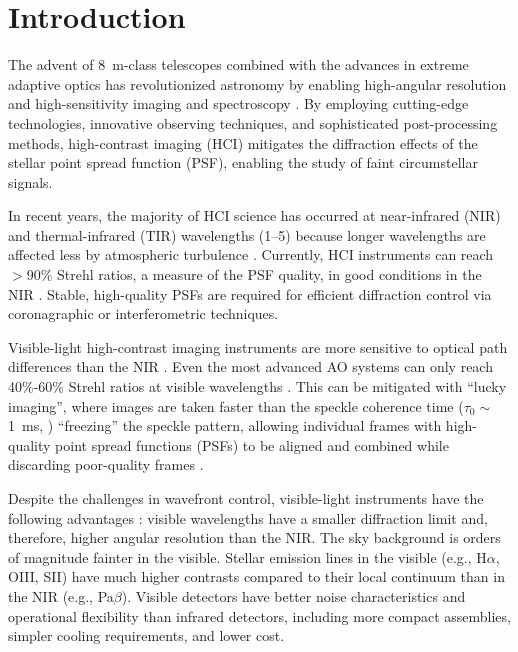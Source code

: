 \section{Introduction}\label{sec:intro}

The advent of \SI{8}{\meter}-class telescopes combined with the advances in extreme adaptive optics has revolutionized astronomy by enabling high-angular resolution and high-sensitivity imaging and spectroscopy \citep{guyon_extreme_2018}. By employing cutting-edge technologies, innovative observing techniques, and sophisticated post-processing methods, high-contrast imaging (HCI) mitigates the diffraction effects of the stellar point spread function (PSF), enabling the study of faint circumstellar signals.

In recent years, the majority of HCI science has occurred at near-infrared (NIR) and thermal-infrared (TIR) wavelengths (\SIrange{1}{5}{\micron}) because longer wavelengths are affected less by atmospheric turbulence \citep{fried_optical_1966,roddier_effects_1981}. Currently, HCI instruments can reach $>$90\% Strehl ratios, a measure of the PSF quality, in good conditions in the NIR \citep{beuzit_sphere_2019,lozi_status_2020}. Stable, high-quality PSFs are required for efficient diffraction control via coronagraphic or interferometric techniques.

Visible-light high-contrast imaging instruments are more sensitive to optical path differences than the NIR \citep{fried_optical_1966,roddier_effects_1981}. Even the most advanced AO systems can only reach 40\%-60\% Strehl ratios at visible wavelengths \citep{ahn_scexao_2021,males_magao-x_2022}. This can be mitigated with ``lucky imaging'', where images are taken faster than the speckle coherence time ($\tau_0 \sim$\SI{1}{\milli\second}, \citealp{kooten_climate_2022}) ``freezing'' the speckle pattern, allowing individual frames with high-quality point spread functions (PSFs) to be aligned and combined while discarding poor-quality frames \citep{law_lucky_2006, garrel_highly_2012, lang_tractor_2016}.

Despite the challenges in wavefront control, visible-light instruments have the following advantages \citep{close_into_2014}: visible wavelengths have a smaller diffraction limit and, therefore, higher angular resolution than the NIR. The sky background is orders of magnitude fainter in the visible. Stellar emission lines in the visible (e.g., H$\alpha$, OIII, SII) have much higher contrasts compared to their local continuum than in the NIR (e.g., Pa$\beta$). Visible detectors have better noise characteristics and operational flexibility than infrared detectors, including more compact assemblies, simpler cooling requirements, and lower cost.

